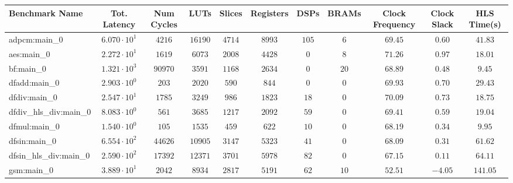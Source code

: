 \begin{tabular}{|l|c|c|c|c|c|c|c|c|c|c|}
\hline
Benchmark Name          & Tot. Latency           & Num Cycles & LUTs      & Slices    & Registers & DSPs    & BRAMs   & Clock Frequency & Clock Slack & HLS Time(s) \\
\hline
adpcm:main\_0           & $ 6.070 \cdot 10^{1} $ & $ 4216   $ & $ 16190 $ & $ 4714  $ & $ 8993  $ & $ 105 $ & $ 6   $ & $ 69.45       $ & $ 0.60    $ & $ 41.83   $ \\
aes:main\_0             & $ 2.272 \cdot 10^{1} $ & $ 1619   $ & $ 6073  $ & $ 2008  $ & $ 4428  $ & $ 0   $ & $ 8   $ & $ 71.26       $ & $ 0.97    $ & $ 18.01   $ \\
bf:main\_0              & $ 1.321 \cdot 10^{3} $ & $ 90970  $ & $ 3591  $ & $ 1168  $ & $ 2634  $ & $ 0   $ & $ 20  $ & $ 68.89       $ & $ 0.48    $ & $ 9.45    $ \\
dfadd:main\_0           & $ 2.903 \cdot 10^{0} $ & $ 203    $ & $ 2020  $ & $ 590   $ & $ 844   $ & $ 0   $ & $ 0   $ & $ 69.93       $ & $ 0.70    $ & $ 29.43   $ \\
dfdiv:main\_0           & $ 2.547 \cdot 10^{1} $ & $ 1785   $ & $ 3249  $ & $ 986   $ & $ 1823  $ & $ 18  $ & $ 0   $ & $ 70.09       $ & $ 0.73    $ & $ 18.75   $ \\
dfdiv\_hls\_div:main\_0 & $ 8.083 \cdot 10^{0} $ & $ 561    $ & $ 3685  $ & $ 1217  $ & $ 2092  $ & $ 59  $ & $ 0   $ & $ 69.41       $ & $ 0.59    $ & $ 19.04   $ \\
dfmul:main\_0           & $ 1.540 \cdot 10^{0} $ & $ 105    $ & $ 1535  $ & $ 459   $ & $ 622   $ & $ 10  $ & $ 0   $ & $ 68.19       $ & $ 0.34    $ & $ 9.95    $ \\
dfsin:main\_0           & $ 6.554 \cdot 10^{2} $ & $ 44626  $ & $ 10905 $ & $ 3147  $ & $ 5323  $ & $ 41  $ & $ 0   $ & $ 68.09       $ & $ 0.31    $ & $ 61.62   $ \\
dfsin\_hls\_div:main\_0 & $ 2.590 \cdot 10^{2} $ & $ 17392  $ & $ 12371 $ & $ 3701  $ & $ 5978  $ & $ 82  $ & $ 0   $ & $ 67.15       $ & $ 0.11    $ & $ 64.11   $ \\
gsm:main\_0             & $ 3.889 \cdot 10^{1} $ & $ 2042   $ & $ 8934  $ & $ 2817  $ & $ 5191  $ & $ 62  $ & $ 10  $ & $ 52.51       $ & $ -4.05   $ & $ 141.05  $ \\

\end{tabular}
